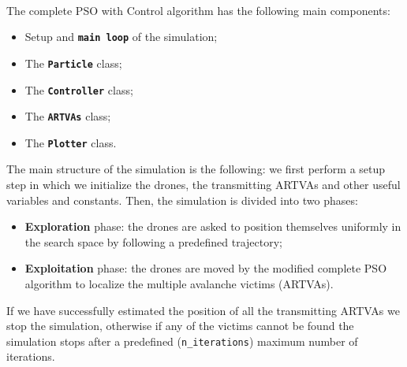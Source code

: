 \documentclass[main]{subfiles}
\begin{document}
\noindent\\
The complete PSO with Control algorithm has the following main components: 
\begin{itemize}
    \item Setup and \textbf{\texttt{main loop}} of the simulation;
    \item The \textbf{\texttt{Particle}} class;
    \item The \textbf{\texttt{Controller}} class;
    \item The \textbf{\texttt{ARTVAs}} class;
    \item The \textbf{\texttt{Plotter}} class.
\end{itemize}
The main structure of the simulation is the following: 
we first perform a setup step in which we initialize the drones, 
the transmitting ARTVAs and other useful variables and constants.
Then, the simulation is divided into two phases:
\begin{itemize}
    \item \textbf{Exploration} phase: the drones are asked to position 
 themselves uniformly in the search space by following a
 predefined trajectory;
    \item \textbf{Exploitation} phase: the drones are moved by the modified complete
 PSO algorithm to localize the multiple avalanche victims (ARTVAs).
\end{itemize}
If we have successfully estimated the position of all 
the transmitting ARTVAs we stop the simulation, otherwise if any of the 
victims cannot be found the simulation stops after
a predefined (\texttt{n\_iterations}) maximum number of iterations.
\end{document}
